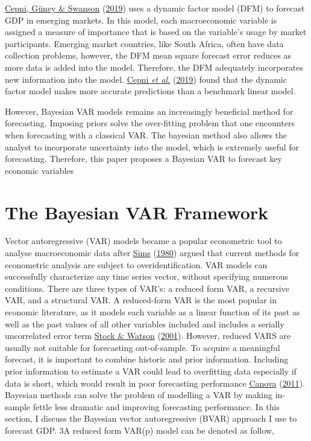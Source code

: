 \documentclass[11pt,preprint, authoryear]{elsarticle}
\numberwithin{equation}{section}
\numberwithin{figure}{section}
\numberwithin{table}{section}
\begin{document}
\protect\hyperlink{ref-cepni}{Cepni, Güney \& Swanson}
(\protect\hyperlink{ref-cepni}{2019}) uses a dynamic factor model (DFM)
to forecast GDP in emerging markets. In this model, each macroeconomic
variable is assigned a measure of importance that is based on the
variable's usage by market participants. Emerging market countries, like
South Africa, often have data collection problems, however, the DFM mean
square forecast error reduces as more data is added into the model.
Therefore, the DFM adequately incorporates new information into the
model. \protect\hyperlink{ref-cepni}{Cepni \emph{et al.}}
(\protect\hyperlink{ref-cepni}{2019}) found that the dynamic factor
model makes more accurate predictions than a benchmark linear model.

However, Bayesian VAR models remains an increasingly beneficial method
for forecasting. Imposing priors solve the over-fitting problem that one
encounters when forecasting with a classical VAR. The bayesian method
also allows the analyst to incorporate uncertainty into the model, which
is extremely useful for forecasting. Therefore, this paper proposes a
Bayesian VAR to forecast key economic variables

\hypertarget{the-bayesian-var-framework}{%
\section{The Bayesian VAR Framework}\label{the-bayesian-var-framework}}

Vector autoregressive (VAR) models became a popular econometric tool to
analyse macroeconomic data after \protect\hyperlink{ref-sims1980}{Sims}
(\protect\hyperlink{ref-sims1980}{1980}) argued that current methods for
econometric analysis are subject to overidentification. VAR models can
successfully characterize any time series vector, without specifying
numerous conditions. There are three types of VAR's: a reduced form VAR,
a recursive VAR, and a structural VAR. A reduced-form VAR is the most
popular in economic literature, as it models each variable as a linear
function of its past as well as the past values of all other variables
included and includes a serially uncorrelated error term
\protect\hyperlink{ref-stock2001}{Stock \& Watson}
(\protect\hyperlink{ref-stock2001}{2001}). However, reduced VARS are
usually not suitable for forecasting out-of-sample. To acquire a
meaningful forecast, it is important to combine historic and prior
information. Including prior information to estimate a VAR could lead to
overfitting data especially if data is short, which would result in poor
forecasting performance \protect\hyperlink{ref-can2011}{Canova}
(\protect\hyperlink{ref-can2011}{2011}). Bayesian methods can solve the
problem of modelling a VAR by making in-sample fettle less dramatic and
improving forecasting performance. In this section, I discuss the
Bayesian vector autoregressive (BVAR) approach I use to forecast GDP. 3A
reduced form VAR(p) model can be denoted as follow,
\end{document}
